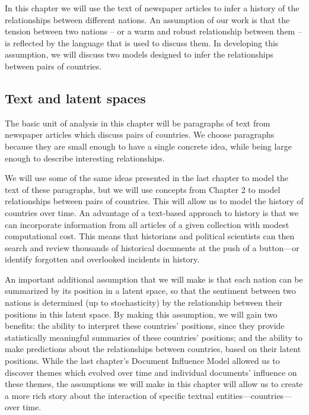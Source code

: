 In this chapter we will use the text of newspaper articles to infer a
history of the relationships between different nations.  An assumption
of our work is that the tension between two nations -- or a warm and
robust relationship between them -- is reflected by the language that
is used to discuss them.  In developing this assumption, we will
discuss two models designed to infer the relationships between pairs
of countries.

\subsection*{Text and latent spaces}
The basic unit of analysis in this chapter will be paragraphs of text
from newspaper articles which discuss pairs of countries.  We choose
paragraphs because they are small enough to have a single concrete
idea, while being large enough to describe interesting relationships.

We will use some of the same ideas presented in the last chapter to
model the text of these paragraphs, but we will use concepts from
Chapter 2 to model relationships between pairs of countries.  This
will allow us to model the history of countries over time.  An
advantage of a text-based approach to history is that we can
incorporate information from all articles of a given collection with
modest computational cost.  This means that historians and political
scientists can then search and review thousands of historical
documents at the push of a button---or identify forgotten and
overlooked incidents in history.

An important additional assumption that we will make is that each
nation can be summarized by its position in a latent space, so that
the sentiment between two nations is determined (up to stochasticity)
by the relationship between their positions in this latent space.  By
making this assumption, we will gain two benefits: the ability to
interpret these countries' positions, since they provide statistically
meaningful summaries of these countries' positions; and the ability to
make predictions about the relationships between countries, based on
their latent positions. While the last chapter's Document Influence
Model allowed us to discover themes which evolved over time and individual
documents' influence on these themes, the assumptions we will make in
this chapter will allow us to create a more rich story about the
interaction of specific textual entities---countries---over time.


